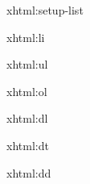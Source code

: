 
\startxmlsetups xhtml:setup-list
\stopxmlsetups


\startxmlsetups xhtml:li
	\item
\stopxmlsetups

\startxmlsetups xhtml:ul
	\startitemize
	\stopitemize
\stopxmlsetups

\startxmlsetups xhtml:ol
	\startitemize[n]
	\stopitemize
\stopxmlsetups


\startxmlsetups xhtml:dl
	\par
\stopxmlsetups

\startxmlsetups xhtml:dt
	\crlf
\stopxmlsetups

\startxmlsetups xhtml:dd
	\startnarrower
	\stopnarrower
\stopxmlsetups

